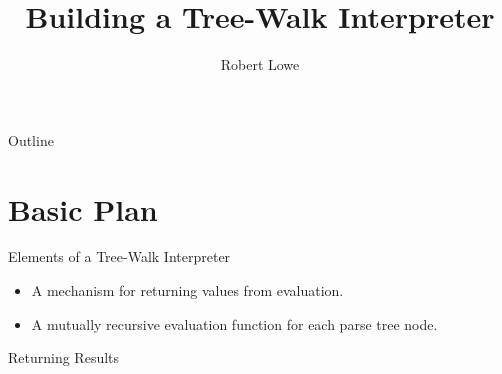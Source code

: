 \documentclass[handout]{beamer}
\title{Building a Tree-Walk Interpreter}
\author{Robert Lowe}
\institute[Southeast Missouri State University] %
{
  Department of Computer Science\\
  Southeast Missouri State University
}
\date[]{}
\newenvironment{code}{%
 \VerbatimEnvironment
 \begin{adjustbox}{max width=\textwidth, max height=0.7\textheight}
 \begin{BVerbatim}
  }{
  \end{BVerbatim}
 \end{adjustbox}
}
\begin{document}
\begin{frame}
  \titlepage
\end{frame}

\begin{frame}{Outline}
  \tableofcontents
\end{frame}





\section{Basic Plan}
\begin{frame}{Elements of a Tree-Walk Interpreter}
    \begin{itemize}
        \item A mechanism for returning values from evaluation.
        \item A mutually recursive evaluation function for each parse tree node.
    \end{itemize}
\end{frame}

\begin{frame}[fragile]{Returning Results}
\end{frame}
\end{document}
